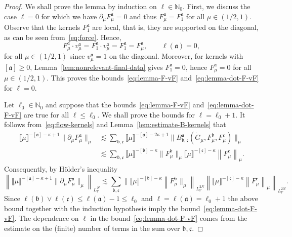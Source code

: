 \documentclass{article}
\numberwithin{equation}{section}
\theoremstyle{plain}
\theoremstyle{definition}
\begin{document}
  \begin{proof}
  We shall prove the lemma by induction on $\ell \in \mathbb{N}_0$. First, we
  discuss the case $\ell = 0$ for which we have $\partial_{\mu}
  F^{\mathfrak{a}}_{\mu} = 0$ and thus $F^{\mathfrak{a}}_{\mu} =
  F^{\mathfrak{a}}_1$ for all $\mu \in (1 / 2, 1)$. Observe that the kernels
  $F^{\mathfrak{a}}_1$ are local, that is, they are supported on the diagonal,
  as can be seen from~\eqref{eq:force}. Hence,
  \[ F^{\mathfrak{a}}_{\mu} \cdot v^{\mathfrak{a}}_{\mu} = F^{\mathfrak{a}}_1
     \cdot v^{\mathfrak{a}}_{\mu} = F^{\mathfrak{a}}_1 =
     F^{\mathfrak{a}}_{\mu}, \qquad \ell (\mathfrak{a}) = 0, \]
  for all $\mu \in (1 / 2, 1)$ since $v^{\mathfrak{a}}_{\mu} = 1$ on the
  diagonal. Moreover, for kernels with $[\mathfrak{a}] \geqslant 0$,
  Lemma~\ref{lem:nonrelevant-final-data} gives $F^{\mathfrak{a}}_1 = 0$, hence
  $F^{\mathfrak{a}}_{\mu} = 0$ for all $\mu \in (1 / 2, 1)$. This proves the
  bounds~\eqref{eq:lemma-F-vF} and~\eqref{eq:lemma-dot-F-vF} for $\ell = 0$.
  
  Let $\ell_0 \in \mathbb{N}_0$ and suppose that the
  bounds~\eqref{eq:lemma-F-vF} and~\eqref{eq:lemma-dot-F-vF} are true for all
  $\ell \leqslant \ell_0$. We shall prove the bounds for $\ell = \ell_0 + 1$.
  It follows from~\eqref{eq:flow-kernels} and
  Lemma~\ref{lem:estimate-B-kernels} that
  \begin{align*}
    \llbracket \mu \rrbracket^{- [\mathfrak{a}] - \kappa + 1}
    \| \partial_{\mu} F^{\mathfrak{a}}_{\mu} \|_{\mu}
    &\lesssim \sum_{\mathfrak{b}, \mathfrak{c}}
    \llbracket \mu \rrbracket^{- [\mathfrak{a}] - 2 \kappa + 1}
    \| B^{\mathfrak{a}}_{\mathfrak{b}, \mathfrak{c}}
    (\dot{G}_{\mu}, F^{\mathfrak{b}}_{\mu},
    F^{\mathfrak{c}}_{\mu}) \|_{\mu}\\
    &\lesssim \sum_{\mathfrak{b}, \mathfrak{c}}
    \llbracket \mu \rrbracket^{- [\mathfrak{b}] - \kappa}
    \| F^{\mathfrak{b}}_{\mu} \|_{\mu}
    \llbracket \mu \rrbracket^{- [\mathfrak{c}] - \kappa}
    \left\| F^{\text{} \mathfrak{c}}_{\mu} \right\|_{\mu} .
  \end{align*}
  Consequently, by H{\"o}lder's inequality
  \[ \left\| \llbracket \mu \rrbracket^{- [\mathfrak{a}] - \kappa + 1} \|
     \partial_{\mu} F^{\mathfrak{a}}_{\mu} \|_{\mu} \right\|_{L_{\mathbb{P}}^N}
     \lesssim \sum_{\mathfrak{b}, \mathfrak{c}} \| \llbracket \mu
     \rrbracket^{- [\mathfrak{b}] - \kappa} \left\| F^{\mathfrak{b}}_{\mu} \|_{\mu}
     \right\|_{L_{\mathbb{P}}^{2 N}}  \left\| \llbracket \mu \rrbracket^{-
     [\mathfrak{c}] - \kappa} \left\| F^{\text{} \mathfrak{c}}_{\mu}
     \right\|_{\mu} \right\|_{L_{\mathbb{P}}^{2 N}} . \]
  Since $\ell (\mathfrak{b}) \vee \ell (\mathfrak{c}) \leqslant \ell
  (\mathfrak{a}) - 1 \leqslant \ell_0$ and $\ell = \ell (\mathfrak{a}) =
  \ell_0 + 1$ the above bound together with the induction hypothesis imply the
  bound~\eqref{eq:lemma-dot-F-vF}. The dependence on $\ell$ in the
  bound~\eqref{eq:lemma-dot-F-vF} comes from the estimate on the (finite)
  number of terms in the sum over $\mathfrak{b}, \mathfrak{c}$.
  

\end{proof}
\end{document}
